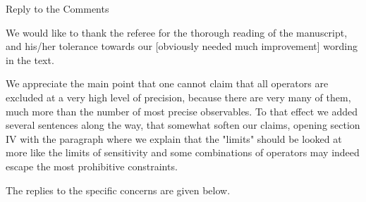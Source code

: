 \documentclass[12pt,preprintnumbers,nofootinbib]{revtex4}
\begin{document}
\begin{center}
\centering
\Large
Reply to the Comments
\end{center}

We would like to thank the referee for the thorough reading of the 
manuscript, and his/her tolerance towards our [obviously needed much 
improvement] wording in the text. 

We appreciate the main point that one cannot claim that all operators are
excluded at a very high level of precision, because there are very many of them, much 
more than the number of most precise observables. To that effect we added 
several sentences along the way, that somewhat soften our claims, opening 
section IV with the paragraph where we explain that the "limits" should be 
looked at more like the limits of sensitivity and some combinations of operators may indeed
escape the most prohibitive constraints. 

The replies to the specific concerns are given below. 
\end{document}
